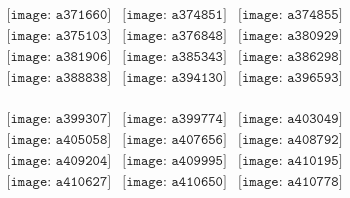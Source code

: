 \documentclass{article}
\begin{document}
        \clearpage
        \begin{figure}[H]
 \begin{center}$
 \begin{array}{cccc}
\texttt{[image: a371660]}&\texttt{[image: a374851]}&\texttt{[image: a374855]}\\\texttt{[image: a375103]}&\texttt{[image: a376848]}&\texttt{[image: a380929]}\\\texttt{[image: a381906]}&\texttt{[image: a385343]}&\texttt{[image: a386298]}\\\texttt{[image: a388838]}&\texttt{[image: a394130]}&\texttt{[image: a396593]}\\
\end{array}$
\end{center}
\end{figure}

\begin{figure}[H]
 \begin{center}$
 \begin{array}{cccc}
\texttt{[image: a399307]}&\texttt{[image: a399774]}&\texttt{[image: a403049]}\\\texttt{[image: a405058]}&\texttt{[image: a407656]}&\texttt{[image: a408792]}\\\texttt{[image: a409204]}&\texttt{[image: a409995]}&\texttt{[image: a410195]}\\\texttt{[image: a410627]}&\texttt{[image: a410650]}&\texttt{[image: a410778]}\\
\end{array}$
\end{center}
\end{figure}
\end{document}
